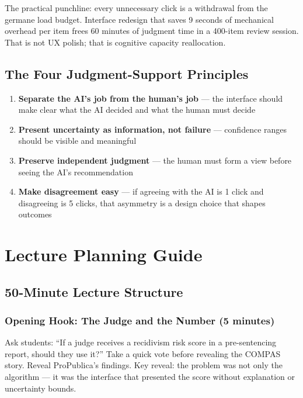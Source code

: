 \begin{keyconcept}
The practical punchline: every unnecessary click is a withdrawal from the germane load budget. Interface redesign that saves 9 seconds of mechanical overhead per item frees 60 minutes of judgment time in a 400-item review session. That is not UX polish; that is cognitive capacity reallocation.
\end{keyconcept}

\subsection{The Four Judgment-Support Principles}

\begin{enumerate}
    \item \textbf{Separate the AI's job from the human's job} --- the interface should make clear what the AI decided and what the human must decide
    \item \textbf{Present uncertainty as information, not failure} --- confidence ranges should be visible and meaningful
    \item \textbf{Preserve independent judgment} --- the human must form a view before seeing the AI's recommendation
    \item \textbf{Make disagreement easy} --- if agreeing with the AI is 1 click and disagreeing is 5 clicks, that asymmetry is a design choice that shapes outcomes
\end{enumerate}

\section{Lecture Planning Guide}

\subsection{50-Minute Lecture Structure}

\subsubsection{Opening Hook: The Judge and the Number (5 minutes)}

Ask students: ``If a judge receives a recidivism risk score in a pre-sentencing report, should they use it?'' Take a quick vote before revealing the COMPAS story. Reveal ProPublica's findings. Key reveal: the problem was not only the algorithm --- it was the interface that presented the score without explanation or uncertainty bounds.

